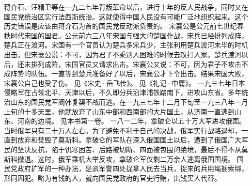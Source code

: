 \begin{maonote}
蒋介石、汪精卫等在一九二七年背叛革命以后，进行十年的反人民战争，同时又在国民党统治区实行法西斯统治。这就使得中国人民没有可能广泛地组织起来。这个历史错误是应该由蒋介石为首的国民党反动派负责的。
宋襄公是公元前七世纪春秋时代宋国的国君。公元前六三八年宋国与强大的楚国作战，宋兵已经排列成阵，楚兵正在渡河。宋国有一个官员认为楚兵多宋兵少，主张利用楚兵渡河未毕的时机出击。但宋襄公说：不可，因为君子不乘别人困难的时候去攻打人家。楚兵渡河以后，还未排列成阵，宋国官员又请求出击。宋襄公又说：不可，因为君子不攻击不成阵势的队伍。一直等到楚兵准备好了以后，宋襄公才下令出击。结果宋国大败，宋襄公自己也受了伤。
见《宋史·岳飞传》。
见《礼记·中庸》。
一九三七年日本侵略军在占领北平、天津以后，不久即分兵沿津浦铁路南下，进攻山东省。多年统治山东的国民党军阀韩复榘不战而逃。在一九三七年十二月下旬至一九三八年一月上旬的十多天里，他就放弃了山东中部和西南部的大片国土，从济南一直逃到山东、河南的边境。
见本书第一卷。
一八一二年，拿破仑以五十万大军进攻俄国。当时俄军只有二十万人左右。为了避免不利于自己的决战，俄军实行战略退却，一直到放弃和焚毁了莫斯科。拿破仑的军队在深入俄国国土以后，遭到了俄国广大军民的坚决反抗，陷于饥寒困苦、后路被切断、四面被包围的绝境，最后不得不从莫斯科撤退。这时，俄军乘机大举反攻，拿破仑军仅剩二万余人逃离俄国国境。
国民党政府扩军的一种办法，是派军警四处捉拿人民去当兵，捉来的兵用绳捆索绑，形同囚犯。略为有钱的人，就向国民党政府的官吏行贿，出钱买人代替。
\end{maonote}
